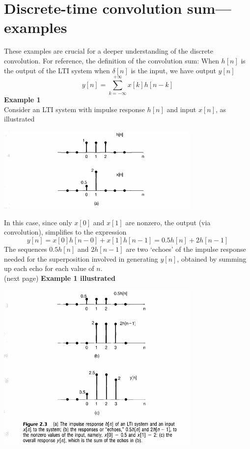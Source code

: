 \documentclass{report}
\begin{document}
\section{Discrete-time convolution sum---examples}
These examples are crucial for a deeper understanding of the discrete convolution. For reference, the definition of the 
convolution sum: When $h[n]$ is the output of the LTI system when $\delta[n]$ is the input, we have output $y[n]$
\begin{equation*}
y[n]=\sum^{+\infty}_{k=-\infty}x[k]h[n-k]
\end{equation*}
\textbf{Example 1}\\
Consider an LTI system with impulse response $h[n]$ and input $x[n]$, as illustrated
\begin{center}
\includegraphics[width=10cm]{a20}
\end{center}
In this case, since only $x[0]$ and $x[1]$ are nonzero, the output (via convolution), simplifies to the expression
\begin{equation*}
y[n]=x[0]h[n-0]+x[1]h[n-1]=0.5h[n]+2h[n-1]
\end{equation*}
The sequences $0.5h[n]$ and $2h[n-1]$ are two `echoes' of the impulse response needed for the superposition involved in generating
$y[n]$, obtained by summing up each echo for each value of $n$.\\
(next page)\newpage
\textbf{Example 1 illustrated}
\begin{center}
\includegraphics[width=10cm]{a21}\\
\end{center}
\end{document}

